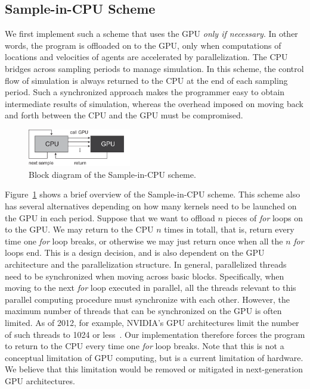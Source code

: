 \documentclass[times, 10pt, twocolumn]{article}
\begin{document}
\subsection{Sample-in-CPU Scheme}
\label{sec:sample-in-cpu}

We first implement such a scheme that uses the GPU \textit{only if
necessary}.
In other words, the program is offloaded on to the GPU, only when
computations of locations and velocities of agents are accelerated by
parallelization.
The CPU bridges across sampling periods to manage simulation.
In this scheme, the control flow of simulation is always returned to the
CPU at the end of each sampling period.
Such a synchronized approach makes the programmer easy to
obtain intermediate results of simulation, whereas the overhead imposed
on moving back and forth between the CPU and the GPU must be
compromised.

\begin{figure}[t]
\centering
\includegraphics[width=0.4\textwidth]{eps/sample-in-cpu.eps}
\caption{Block diagram of the Sample-in-CPU scheme.}
\label{fig:sample-in-cpu}
\end{figure}

Figure~\ref{fig:sample-in-cpu} shows a brief overview of the
Sample-in-CPU scheme.
This scheme also has several alternatives depending on how many kernels
need to be launched on the GPU in each period. 
Suppose that we want to offload $n$ pieces of \textit{for} loops on to
the GPU.
We may return to the CPU $n$ times in totall, that is, return every time
one \textit{for} loop breaks, or otherwise we may just return once when
all the $n$ \textit{for} loops end.
This is a design decision, and is also dependent on the GPU architecture
and the parallelization structure.
In general, parallelized threads need to be synchronized when moving
across basic blocks.
Specifically, when moving to the next \textit{for} loop executed in
parallel, all the threads relevant to this parallel computing procedure
must synchronize with each other.
However, the maximum number of threads that can be synchronized on the
GPU is often limited.
As of 2012, for example, NVIDIA's GPU architectures limit the number of
such threads to 1024 or less~\cite{NVIDIA_Kepler}.
Our implementation therefore forces the program to return to the CPU
every time one \textit{for} loop breaks.
Note that this is not a conceptual limitation of GPU computing, but is a
current limitation of hardware.
We believe that this limitation would be removed or mitigated in
next-generation GPU architectures.
\end{document}
